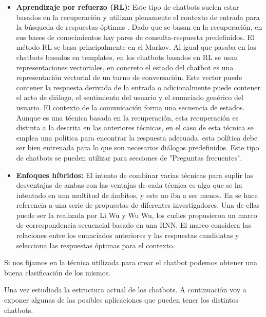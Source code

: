 \begin{itemize}
\item \textbf{Aprendizaje por refuerzo (RL):} Este tipo de chatbots suelen estar basados en la recuperación y utilizan plenamente el contexto de entrada para la búsqueda de respuestas óptimas \cite{RefWorks:RefID:36-luo2022critical}. Dado que se basan en la recuperación, en sus bases de conocimientos hay pares de consulta-respuesta predefinidos. El método RL se basa principalmente en el \gls{Markov}. Al igual que pasaba en los chatbots basados en templates, en los chatbots basados en RL se usan representaciones vectoriales, en concreto el estado del chatbot es una representación vectorial de un turno de conversación. Este vector puede contener la respuesta derivada de la entrada o adicionalmente puede contener el acto de diálogo, el sentimiento del usuario y el enunciado genérico del usuario. El contexto de la comunicación forma una secuencia de estados. Aunque es una técnica basada en la recuperación, esta recuperación es distinta a la descrita en las anteriores técnicas, en el caso de esta técnica se emplea una política para encontrar la respuesta adecuada, esta política debe ser bien entrenada para lo que son necesarios diálogos predefinidos. Este tipo de chatbots se pueden utilizar para secciones de "Preguntas frecuentes".
\item \textbf{Enfoques híbridos:} \label{enfoque_hibrido} El intento de combinar varias técnicas para suplir las desventajas de ambas con las ventajas de cada técnica es algo que se ha intentado en una multitud de ámbitos, y este no iba a ser menos. En \cite{RefWorks:RefID:36-luo2022critical} se hace referencia a una serie de propuestas de diferentes investigadores. Una de ellas puede ser la realizada por Li Wu y Wu Wu, los cuáles propusieron un marco de correspondencia secuencial basado en una RNN. El marco considera las relaciones entre los enunciados anteriores y las respuestas candidatas y selecciona las respuestas óptimas para el contexto.
\end{itemize}

Si nos fijamos en la técnica utilizada para crear el chatbot podemos obtener una buena clasificación de los mismos.

Una vez estudiada la estructura actual de los chatbots. A continuación voy a exponer algunas de las posibles aplicaciones que pueden tener los distintos chatbots.

